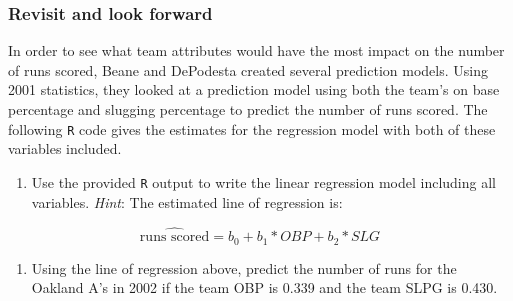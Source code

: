 \documentclass[
]{report}
\newenvironment{Shaded}{\begin{snugshade}}{\end{snugshade}}
\newcommand{\CommentTok}[1]{\textcolor[rgb]{0.56,0.35,0.01}{\textit{#1}}}
\newcommand{\DataTypeTok}[1]{\textcolor[rgb]{0.13,0.29,0.53}{#1}}
\newcommand{\DecValTok}[1]{\textcolor[rgb]{0.00,0.00,0.81}{#1}}
\newcommand{\KeywordTok}[1]{\textcolor[rgb]{0.13,0.29,0.53}{\textbf{#1}}}
\newcommand{\NormalTok}[1]{#1}
\newcommand{\OperatorTok}[1]{\textcolor[rgb]{0.81,0.36,0.00}{\textbf{#1}}}
\newcommand{\StringTok}[1]{\textcolor[rgb]{0.31,0.60,0.02}{#1}}
\providecommand{\tightlist}{%
  \setlength{\itemsep}{0pt}\setlength{\parskip}{0pt}}
\begin{document}
\hypertarget{revisit-and-look-forward-4}{%
\subsubsection*{Revisit and look forward}\label{revisit-and-look-forward-4}}

In order to see what team attributes would have the most impact on the number of runs scored, Beane and DePodesta created several prediction models. Using 2001 statistics, they looked at a prediction model using both the team's on base percentage and slugging percentage to predict the number of runs scored. The following \texttt{R} code gives the estimates for the regression model with both of these variables included.

\begin{Shaded}
\end{Shaded}

\begin{enumerate}
\def\labelenumi{\arabic{enumi}.}
\setcounter{enumi}{20}
\tightlist
\item
  Use the provided \texttt{R} output to write the linear regression model including all variables. \emph{Hint}: The estimated line of regression is:
\end{enumerate}

\[\widehat{\text{runs scored}} = b_0 + b_1*OBP + b_2*SLG\]

\vspace{1in}

\begin{enumerate}
\def\labelenumi{\arabic{enumi}.}
\setcounter{enumi}{21}
\tightlist
\item
  Using the line of regression above, predict the number of runs for the Oakland A's in 2002 if the team OBP is 0.339 and the team SLPG is 0.430.
\end{enumerate}
\end{document}
